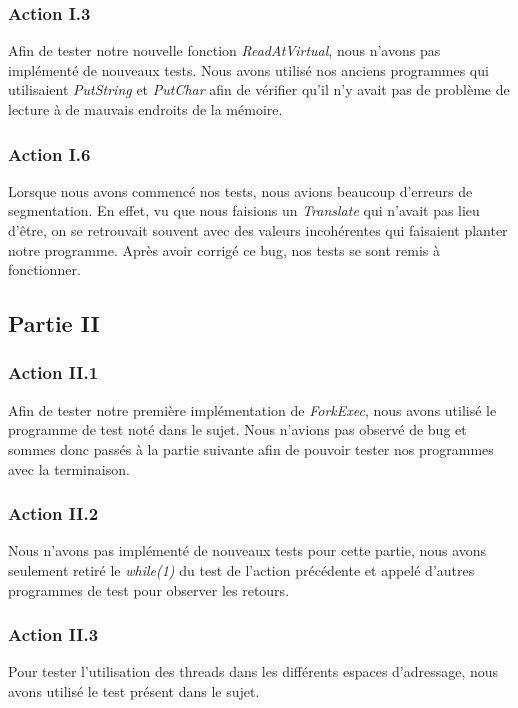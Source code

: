 \documentclass{article}
\begin{document}
\subsubsection{Action I.3}
Afin de tester notre nouvelle fonction \textit{ReadAtVirtual}, nous n'avons pas implémenté de nouveaux tests. Nous avons utilisé nos anciens programmes 
qui utilisaient \textit{PutString} et \textit{PutChar} afin de vérifier qu'il n'y avait pas de problème de lecture à de mauvais endroits de la mémoire.

\subsubsection{Action I.6}
Lorsque nous avons commencé nos tests, nous avions beaucoup d'erreurs de segmentation. En effet, vu que nous faisions un \textit{Translate} qui n'avait pas lieu d'être, on se retrouvait souvent
avec des valeurs incohérentes qui faisaient planter notre programme. Après avoir corrigé ce bug, nos tests se sont remis à fonctionner.

\subsection{Partie II}

\subsubsection{Action II.1}
Afin de tester notre première implémentation de \textit{ForkExec}, nous avons utilisé le programme de test noté dans le sujet.
Nous n'avions pas observé de bug et sommes donc passés à la partie suivante afin de pouvoir tester nos programmes avec la terminaison.

\subsubsection{Action II.2}
Nous n'avons pas implémenté de nouveaux tests pour cette partie, nous avons seulement retiré le \textit{while(1)} du test de 
l'action précédente et appelé d'autres programmes de test pour observer les retours.

\subsubsection{Action II.3}
Pour tester l'utilisation des threads dans les différents espaces d'adressage, nous avons utilisé le test présent dans le sujet.
\end{document}
